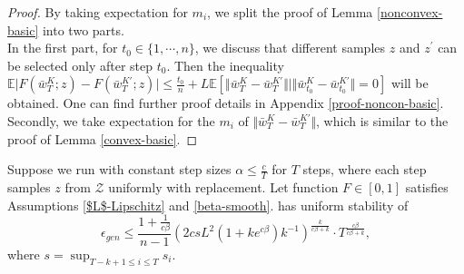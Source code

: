 \begin{proof} By taking expectation for $m_i$, we split the proof of Lemma \ref{nonconvex-basic} into two parts.\\
In the first part, for $t_0 \in \{1,\cdots,n\}$, we discuss that different samples $z$ and $z^{\prime}$ can be selected only after step $t_0$. Then the inequality $\mathbb{E}\vert F(\bar{w}_{T}^K;z)-F(\bar{w}_{T}^{K\prime};z)\vert \leq \frac{t_0}{n} + L \mathbb{E}\left[\Vert \bar{w}_{T}^K - \bar{w}_{T}^{K\prime}\Vert\vert \Vert \bar{w}_{t_0}^K - \bar{w}_{t_0}^{K\prime}\Vert=0\right]$ will be obtained. One can find further proof details in Appendix \ref{proof-noncon-basic}.\\
Secondly, we take expectation for the $m_i$ of $\Vert \bar{w}_{T}^K \!-\! \bar{w}_{T}^{K\prime}\Vert$, which is similar to the proof of Lemma \ref{convex-basic}.
\end{proof}

\begin{theorem}\label{thm:stability-non-with}
Suppose we run \method{} with constant step sizes $\alpha \leq \frac{c}{T}$ for $T$ steps, where each step samples $z$ from $\mathcal{Z}$ uniformly with replacement. Let function $F\in[0,1]$ satisfies Assumptions \ref{$L$-Lipschitz} and \ref{beta-smooth}. \method{} has uniform stability of
\begin{equation}\label{result-5.3}
  \epsilon_{gen}\leq \frac{1+\frac{1}{c\beta}}{n-1}\left(2csL^2(1+ke^{c\beta})k^{-1}\right)^{\frac{k}{c\beta+k}}\cdot T^{\frac{c\beta}{c\beta+k}},
 \end{equation}
where $s=\sup_{T-k+1\leq i\leq T} s_i$.
\end{theorem}

